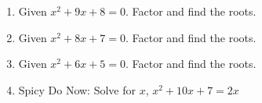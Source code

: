 \begin{enumerate}
\item Given $x^2+9x+8=0$. Factor and find the roots. \vspace{3cm} 

\item Given $x^2+8x+7=0$. Factor and find the roots. \vspace{4cm}

\item Given $x^2+6x+5=0$. Factor and find the roots. %

\item Spicy Do Now: Solve for $x$, $x^2+10x+7=2x$

\end{enumerate}
